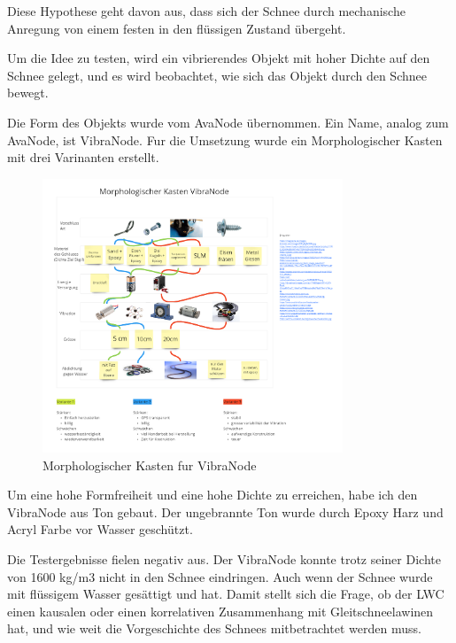 
Diese Hypothese geht davon aus, dass sich der Schnee durch mechanische Anregung von einem festen in den flüssigen Zustand übergeht.

Um die Idee zu testen, wird ein vibrierendes Objekt mit hoher Dichte auf den Schnee gelegt, und es wird beobachtet, wie sich das Objekt durch den Schnee bewegt.

Die Form des Objekts wurde vom AvaNode übernommen.  Ein Name, analog zum AvaNode, ist VibraNode. Fur die Umsetzung wurde ein Morphologischer Kasten mit drei Varinanten erstellt.


\begin{figure}[H]
    \centering
    \includegraphics[width=0.8\textwidth]{Bilder/Unbenann2t.PNG}
    \caption{Morphologischer Kasten fur VibraNode}
    \label{fig:Bildverarbeitnugskonzpet}
\end{figure}


Um eine hohe Formfreiheit und eine hohe Dichte zu erreichen, habe ich den VibraNode aus Ton gebaut. Der ungebrannte Ton wurde durch Epoxy Harz und Acryl Farbe vor Wasser geschützt.

Die Testergebnisse fielen negativ aus. Der VibraNode konnte trotz seiner Dichte von 1600 kg/m3 nicht in den Schnee eindringen. Auch wenn der Schnee wurde mit flüssigem Wasser gesättigt und hat.  Damit  stellt sich die Frage, ob der LWC einen kausalen oder einen korrelativen Zusammenhang mit Gleitschneelawinen hat, und wie weit die Vorgeschichte des Schnees mitbetrachtet werden muss. \cite{Altman.2015}
